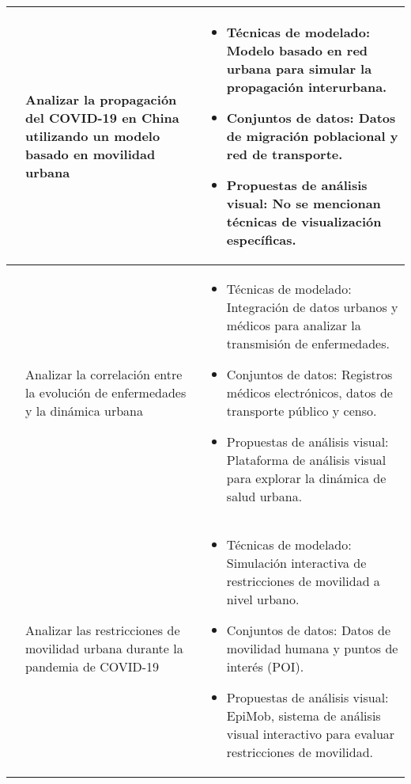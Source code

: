 \documentclass[sigconf]{acmart}
\begin{document}
\begin{table*}[h]
{\begin{tabular}{|p{1cm}|p{4cm}|p{11cm}|}
\cite{wei2020spread} & Analizar la propagación del COVID-19 en China utilizando un modelo basado en movilidad urbana &
\begin{minipage}[t]{11cm}
  \begin{itemize}
    \item Técnicas de modelado: Modelo basado en red urbana para simular la propagación interurbana.
    \item Conjuntos de datos: Datos de migración poblacional y red de transporte.
    \item Propuestas de análisis visual: No se mencionan técnicas de visualización específicas.
  \end{itemize}
\end{minipage} \\ \hline

\cite{zhang2019visual} & Analizar la correlación entre la evolución de enfermedades y la dinámica urbana &
\begin{minipage}[t]{11cm}
  \begin{itemize}
    \item Técnicas de modelado: Integración de datos urbanos y médicos para analizar la transmisión de enfermedades.
    \item Conjuntos de datos: Registros médicos electrónicos, datos de transporte público y censo.
    \item Propuestas de análisis visual: Plataforma de análisis visual para explorar la dinámica de salud urbana.
  \end{itemize}
\end{minipage} \\ \hline

\cite{yang2022epimob} & Analizar las restricciones de movilidad urbana durante la pandemia de COVID-19 &
\begin{minipage}[t]{11cm}
  \begin{itemize}
    \item Técnicas de modelado: Simulación interactiva de restricciones de movilidad a nivel urbano.
    \item Conjuntos de datos: Datos de movilidad humana y puntos de interés (POI).
    \item Propuestas de análisis visual: EpiMob, sistema de análisis visual interactivo para evaluar restricciones de movilidad.
  \end{itemize}
\end{minipage} \\ \hline


\end{tabular}}
\end{table*}
\end{document}
